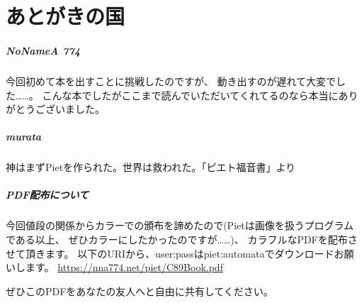 \chapter[あとがきの国]{あとがきの国}

\paragraph{NoNameA 774}

今回初めて本を出すことに挑戦したのですが、
動き出すのが遅れて大変でした……。
こんな本でしたがここまで読んでいただいてくれてるのなら本当にありがとうございました。

\paragraph{murata}

神はまずPietを作られた。世界は救われた。「ピエト福音書」より

\paragraph{PDF配布について}

今回値段の関係からカラーでの頒布を諦めたので(Pietは画像を扱うプログラムである以上、
ぜひカラーにしたかったのですが……)、
カラフルなPDFを配布させて頂きます。
以下のURIから、user:passはpiet:automataでダウンロードお願いします。
\url{https://nna774.net/piet/C89Book.pdf}

ぜひこのPDFをあなたの友人へと自由に共有してください。

